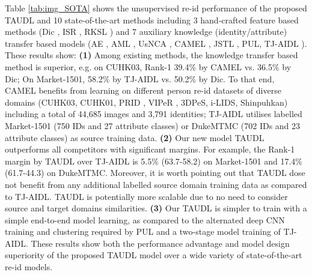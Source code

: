 \documentclass[runningheads]{llncs}
\begin{document}
Table \ref{tab:img_SOTA}
shows the unsupervised re-id performance
of the proposed TAUDL and 10 state-of-the-art methods including 
3 hand-crafted feature based methods 
(Dic \cite{kodirov2015dictionary}, ISR \cite{lisanti2015person}, RKSL \cite{wang2016towards}) and 
7 auxiliary knowledge (identity/attribute) transfer based models 
(AE \cite{lee2008sparse},
AML \cite{ye2007adaptive}, 
UsNCA \cite{qin2015unsupervised}, 
CAMEL \cite{yu2017cross},
JSTL \cite{xiao2016learning},
PUL\cite{fan2017unsupervised},
TJ-AIDL \cite{want2018Transfer}).
These results show:
{\bf(1)}
Among existing methods,
the knowledge transfer based method is superior,
e.g. on CUHK03, Rank-1 39.4\% by CAMEL vs. 36.5\% by Dic; On
Market-1501, 58.2\% by TJ-AIDL vs. 50.2\% by Dic.
To that end, CAMEL benefits from learning on  different
person re-id datasets of diverse domains
(CUHK03\cite{li2014deepreid}, CUHK01\cite{li2012human}, PRID \cite{hirzer2011person}, VIPeR \cite{gray2008viewpoint}, 3DPeS\cite{baltieri20113dpes}, i-LIDS\cite{prosser2010person}, Shinpuhkan\cite{kawanishi2014shinpuhkan2014}) 
including a total of 44,685 images and 3,791 identities;
TJ-AIDL utilises labelled Market-1501 (750 IDs and 27 attribute classes) or DukeMTMC (702 IDs and 23 attribute classes) as source training data.
{\bf (2)} Our new model TAUDL outperforms all competitors with significant margins.
For example, the Rank-1 margin by TAUDL over TJ-AIDL
is 5.5\% (63.7-58.2) on Market-1501 and 17.4\% (61.7-44.3) on DukeMTMC.
Moreover, it is worth pointing out that TAUDL dose not benefit from any
additional labelled source domain training data as compared to TJ-AIDL.
TAUDL is potentially more scalable due to no need to consider source
and target domains similarities. 
{\bf (3)} 
Our TAUDL is simpler to train
with a simple end-to-end model learning, as compared to the alternated
deep CNN training and clustering required by PUL and a two-stage model
training of TJ-AIDL. 
These results show both the performance advantage and 
model design superiority of the proposed TAUDL model
over a wide variety of state-of-the-art re-id models.
\end{document}
